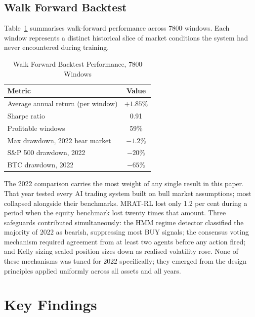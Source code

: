 \documentclass[journal]{IEEEtran}
\begin{document}
\subsection{Walk Forward Backtest}

Table~\ref{tab:backtest} summarises walk-forward performance across 7800
windows. Each window represents a distinct historical slice of market
conditions the system had never encountered during training.

\begin{table}[!t]
\renewcommand{\arraystretch}{1.3}
\caption{Walk Forward Backtest Performance, 7800 Windows}
\label{tab:backtest}
\centering
\begin{tabular}{|l|c|}
\hline
\textbf{Metric}                      & \textbf{Value} \\
\hline
Average annual return (per window)   & $+1.85\%$       \\
Sharpe ratio                         & 0.91            \\
Profitable windows                   & 59\%            \\
Max drawdown, 2022 bear market       & $-1.2\%$        \\
S\&P 500 drawdown, 2022              & $-20\%$         \\
BTC drawdown, 2022                   & $-65\%$         \\
\hline
\end{tabular}
\end{table}

The 2022 comparison carries the most weight of any single result in this
paper. That year tested every AI trading system built on bull market
assumptions; most collapsed alongside their benchmarks. MRAT-RL lost
only 1.2 per cent during a period when the equity benchmark lost twenty
times that amount. Three safeguards contributed simultaneously: the HMM
regime detector classified the majority of 2022 as bearish, suppressing
most BUY signals; the consensus voting mechanism required agreement from
at least two agents before any action fired; and Kelly sizing scaled
position sizes down as realised volatility rose. None of these mechanisms
was tuned for 2022 specifically; they emerged from the design principles
applied uniformly across all assets and all years.

\section{Key Findings}
\label{sec:resultsummary}
\end{document}

